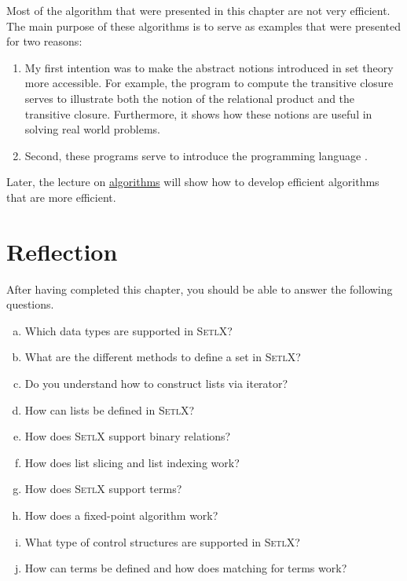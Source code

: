 \remarkEng
Most of the algorithm that were presented in this chapter are not very efficient.  The main purpose of these
algorithms is to serve as examples that were presented for two reasons:
\begin{enumerate}
\item My first intention was to make the abstract notions introduced in set theory more accessible.  For
      example, the program to compute the transitive closure serves to illustrate both the notion of the
      relational product and the transitive closure.  Furthermore, it shows how these notions are useful in
      solving real world problems.
\item Second, these programs serve to introduce the programming language \setlx.
\end{enumerate}
Later, the lecture on
\href{https://github.com/karlstroetmann/Algorithms/blob/master/Lecture-Notes/algorithms.pdf}{algorithms}
will show how to develop efficient algorithms that are more efficient.
\vspace*{0.3cm}


\section{Reflection}
After having completed this chapter, you should be able to answer the following questions.
\begin{enumerate}[(a)]
\item Which data types are supported in \textsc{SetlX}?
\item What are the different methods to define a set in \textsc{SetlX}?
\item Do you understand how to construct lists via iterator? 
\item How can lists be defined in \textsc{SetlX}?
\item How does \textsc{SetlX} support binary relations?
\item How does list slicing and list indexing work?
\item How does \textsc{SetlX} support terms?
\item How does a fixed-point algorithm work?
\item What type of control structures are supported in \textsc{SetlX}?
\item How can terms be defined and how does matching for terms work?
\end{enumerate}


